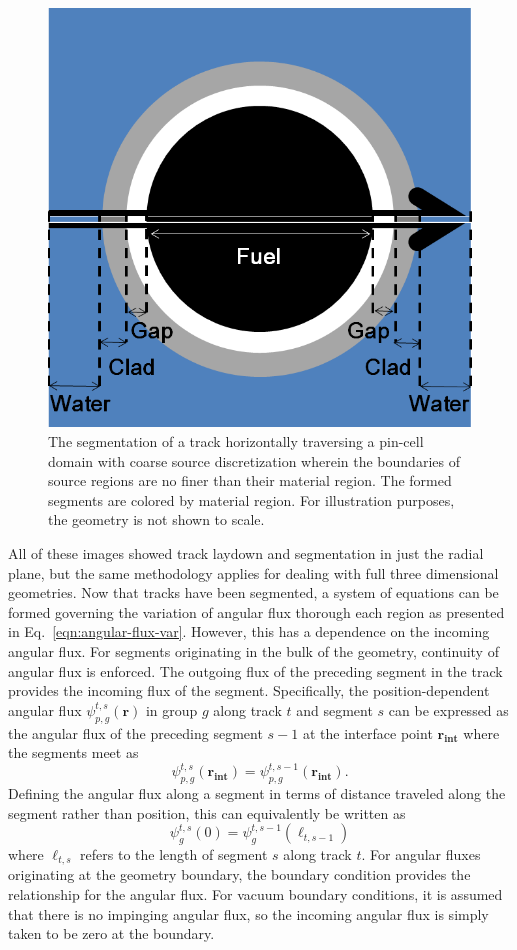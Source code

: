\begin{figure}[h!]
	\centering
	\includegraphics[width=0.6\linewidth]{figures/segmentation.PNG}
	\caption[]{The segmentation of a track horizontally traversing a pin-cell domain with coarse source discretization wherein the boundaries of source regions are no finer than their material region. The formed segments are colored by material region. For illustration purposes, the geometry is not shown to scale.}
	\label{fig:segmentation}
\end{figure}

All of these images showed track laydown and segmentation in just the radial plane, but the same methodology applies for dealing with full three dimensional geometries. Now that tracks have been segmented, a system of equations can be formed governing the variation of angular flux thorough each region as presented in Eq.~\ref{eqn:angular-flux-var}. However, this has a dependence on the incoming angular flux. For segments originating in the bulk of the geometry, continuity of angular flux is enforced. The outgoing flux of the preceding segment in the track provides the incoming flux of the segment. Specifically, the position-dependent angular flux $\psi_{p,g}^{t,s}(\mathbf{r})$ in group $g$ along track $t$ and segment $s$ can be expressed as the angular flux of the preceding segment $s-1$ at the interface point $\mathbf{r_{\textbf{int}}}$ where the segments meet as
\begin{dmath}
	\psi_{p,g}^{t,s}(\mathbf{r_{\textbf{int}}}) = \psi_{p,g}^{t,s-1}(\mathbf{r_{\textbf{int}}}).
\end{dmath}
Defining the angular flux along a segment in terms of distance traveled along the segment rather than position, this can equivalently be written as
\begin{dmath}
	\psi_g^{t,s}(0) = \psi_g^{t,s-1}(\ell_{t,s-1})
	\label{eqn:angular_flux_boundary}
\end{dmath}
where $\ell_{t,s}$ refers to the length of segment $s$ along track $t$. For angular fluxes originating at the geometry boundary, the boundary condition provides the relationship for the angular flux. For vacuum boundary conditions, it is assumed that there is no impinging angular flux, so the incoming angular flux is simply taken to be zero at the boundary. 

